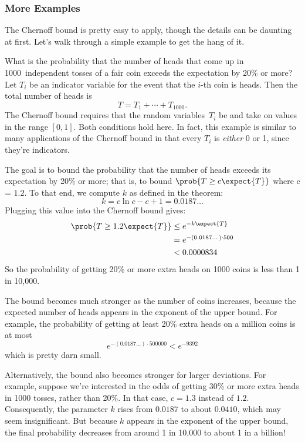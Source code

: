 \subsubsection{More Examples}

The Chernoff bound is pretty easy to apply, though the details can be
daunting at first.  Let's walk through a simple example to get the
hang of it.

What is the probability that the number of heads that come up in
1000~independent tosses of a fair coin exceeds the expectation by 20\%
or more?  Let $T_i$ be an indicator variable for the event that the
$i$-th coin is heads.  Then the total number of heads is
\begin{equation*}
    T = T_1 + \cdots + T_{1000}.
\end{equation*}
The Chernoff bound requires that the random variables~$T_i$ be
 and take on values in the range $[0, 1]$.
Both conditions hold here.  In fact, this example is similar to many
applications of the Chernoff bound in that every $T_i$ is
\emph{either} 0 or 1, since they're indicators.

The goal is to bound the probability that the number of heads exceeds
its expectation by 20\% or more; that is, to bound $\prob{T \geq c
  \expect{T}}$ where c = $1.2$.  To that end, we compute $k$ as
defined in the theorem:
\[
k = c \ln c - c + 1 = 0.0187\dots
\]
Plugging this value into the Chernoff bound gives:
\begin{align*}
\prob{T \geq 1.2 \expect{T}} & \leq  e^{- k \expect{T}} \\
  & = e^{- (0.0187\dots) \cdot 500} \\
  & <  0.0000834
\end{align*}
So the probability of getting 20\% or more extra heads on 1000 coins is
less than 1 in 10,000.

The bound becomes much stronger as the number of coins increases,
because the expected number of heads appears in the exponent of the
upper bound.  For example, the probability of getting at least 20\%
extra heads on a million coins is at most
\[
e^{- (0.0187\dots) \cdot 500000} < e^{-9392}
\]
which is pretty darn small.

Alternatively, the bound also becomes stronger for larger deviations.
For example, suppose we're interested in the odds of getting 30\% or
more extra heads in 1000 tosses, rather than 20\%.  In that case,
$c= 1.3$ instead of $1.2$.  Consequently, the parameter $k$ rises from
$0.0187$ to about $0.0410$, which may seem insignificant.  But because
$k$ appears in the exponent of the upper bound, the final probability
decreases from around 1 in 10,000 to about 1 in a billion!

